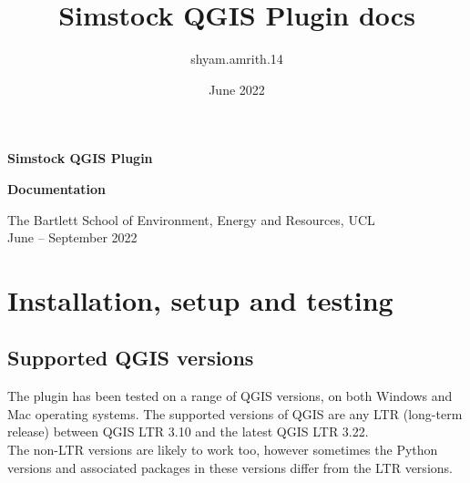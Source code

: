 \documentclass{article}
\title{Simstock QGIS Plugin docs}
\author{shyam.amrith.14 }
\date{June 2022}
\begin{document}
\begin{titlepage}
\begin{center}
\Huge
\textbf{Simstock QGIS Plugin}
\vspace{5mm}

\huge
\textbf{Documentation}

\vspace{2cm}
\large
The Bartlett School of Environment, Energy and Resources, UCL \\
\vspace{1mm}
June -- September 2022
\end{center}
\vspace{2cm}
\tableofcontents
\end{titlepage}
\clearpage

\section{Installation, setup and testing}
\subsection{Supported QGIS versions}
The plugin has been tested on a range of QGIS versions, on both Windows and Mac operating systems. The supported versions of QGIS are any LTR (long-term release) between QGIS LTR 3.10 and the latest QGIS LTR 3.22. \\

The non-LTR versions are likely to work too, however sometimes the Python versions and associated packages in these versions differ from the LTR versions. %
\end{document}

